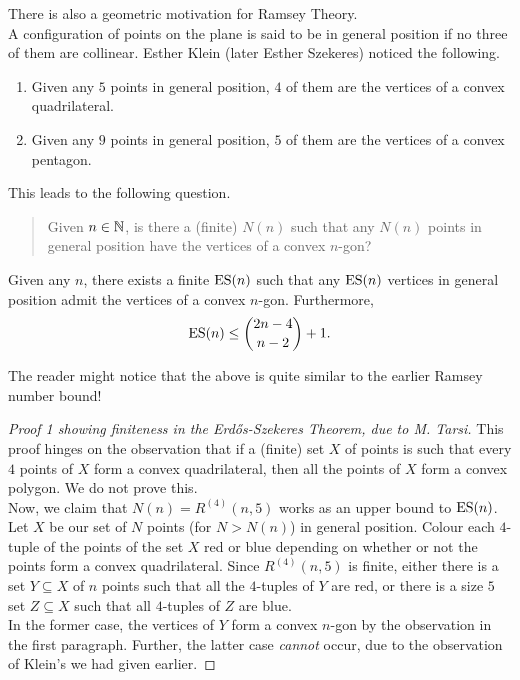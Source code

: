	 There is also a geometric motivation for Ramsey Theory.\\
	 A configuration of points on the plane is said to be in general position if no three of them are collinear. Esther Klein (later Esther Szekeres) noticed the following.
	 \begin{enumerate}
	 	\item Given any $5$ points in general position, $4$ of them are the vertices of a convex quadrilateral.
	 	\item Given any $9$ points in general position, $5$ of them are the vertices of a convex pentagon.
	 \end{enumerate}
	 This leads to the following question.\\
	 \begin{quote}
	 	Given $n\in\mathbb{N}$, is there a (finite) $N(n)$ such that any $N(n)$ points in general position have the vertices of a convex $n$-gon?
	 \end{quote}

	 \begin{ftheo}
	 	Given any $n$, there exists a finite $\operatorname{ES}(n)$ such that any $\operatorname{ES}(n)$ vertices in general position admit the vertices of a convex $n$-gon. Furthermore,
	 	\[ \operatorname{ES}(n) \le \binom{2n-4}{n-2} + 1. \]
	 \end{ftheo}

	 The reader might notice that the above is quite similar to the earlier Ramsey number bound!\\

	 \begin{proof}[Proof 1 showing finiteness in the Erd\H{o}s-Szekeres Theorem, due to M. Tarsi]
	 	This proof hinges on the observation that if a (finite) set $X$ of points is such that every $4$ points of $X$ form a convex quadrilateral, then all the points of $X$ form a convex polygon. We do not prove this.\\
	 	Now, we claim that $N(n) = R^{(4)}(n,5)$ works as an upper bound to $\operatorname{ES}(n)$. Let $X$ be our set of $N$ points (for $N > N(n)$) in general position. Colour each $4$-tuple of the points of the set $X$ red or blue depending on whether or not the points form a convex quadrilateral. Since $R^{(4)}(n,5)$ is finite, either there is a set $Y\subseteq X$ of $n$ points such that all the $4$-tuples of $Y$ are red, or there is a size $5$ set $Z\subseteq X$ such that all $4$-tuples of $Z$ are blue.\\
	 	In the former case, the vertices of $Y$ form a convex $n$-gon by the observation in the first paragraph. Further, the latter case \emph{cannot} occur, due to the observation of Klein's we had given earlier.
	 \end{proof}

